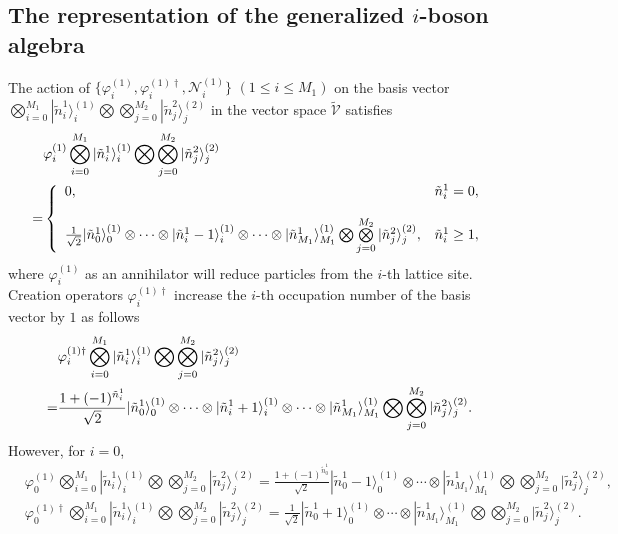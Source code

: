\documentclass[11pt,reqno]{amsart}
\numberwithin{equation}{section}
\begin{document}
\subsection{The representation of the   generalized $i$-boson algebra}
The action of $\{\varphi_i^{(1)},\varphi_i^{(1)\dagger}, \mathcal{N}_i^{(1)} \}$ $( 1\leq i\leq M_1)$ on the basis vector $\bigotimes\limits_{i=0}^{M_{1}}|\tilde{n}_{i}^{1} \rangle_{i}^{(1)}\bigotimes\bigotimes\limits_{j=0}^{M_{2}}|\tilde{n}_{j}^{2}\rangle_{j}^{(2)} $ in the vector space $\tilde{\mathcal{V}}$ satisfies
	\begin{align}\label{right-ym}
		&\varphi_i^{(1)} \bigotimes_{i=0}^{M_{1}}|\tilde{n}_{i}^{1} \rangle_{i}^{(1)}\bigotimes\bigotimes_{j=0}^{M_{2}}|\tilde{n}_{j}^{2}\rangle_{j}^{(2)}   \notag\\
		=&\left\{
		\begin{array}
			{ll}0, & \tilde{n}_{i}^{1}=0, \\
			\\
			\frac{1}{\sqrt{2}}|\tilde{n}_{0}^{1} \rangle_0^{(1)}\otimes\cdots\otimes|\tilde{n}_{i}^{1}-1\rangle_i^{(1)}\otimes\cdots\otimes|\tilde{n}_{M_1}^{1}\rangle_{M_1}^{(1)}\bigotimes\bigotimes\limits_{j=0}^{M_{2}}|\tilde{n}_{j}^{2}\rangle_{j}^{(2)}, & \tilde{n}_{i}^{1}\geq1,
		\end{array}\right.
	\end{align}	
	where $\varphi_i^{(1)}$   as an annihilator will  reduce particles from the $i$-th lattice site.
Creation operators $\varphi_i^{(1)\dagger}$   increase the $i$-th occupation number of the basis vector by $1$ as follows
\begin{align}\label{right-sc}
&\varphi_i^{(1)\dagger}
\bigotimes_{i=0}^{M_{1}}|\tilde{n}_{i}^{1} \rangle_{i}^{(1)}\bigotimes\bigotimes_{j=0}^{M_{2}}|\tilde{n}_{j}^{2}\rangle_{j}^{(2)} 	\notag\\	
=&\frac{1 + (-1)^{\tilde{n}_i^{1}}}{\sqrt{2}} |\tilde{n}_{0}^{1}\rangle_0^{(1)}\otimes\cdots\otimes|\tilde{n}_{i}^{1}+1\rangle_i^{(1)}\otimes\cdots\otimes|\tilde{n}_{M_1}^{1}\rangle_{M_1}^{(1)}\bigotimes\bigotimes\limits_{j=0}^{M_{2}}|\tilde{n}_{j}^{2}\rangle_{j}^{(2)}.
\end{align}	
However, for $i=0$,
\begin{align}
&\varphi_0^{(1)}
\bigotimes_{i=0}^{M_{1}}|\tilde{n}_{i}^{1} \rangle_{i}^{(1)}\bigotimes\bigotimes_{j=0}^{M_{2}}|\tilde{n}_{j}^{2}\rangle_{j}^{(2)} 		=\frac{1 + (-1)^{\tilde{n}_0^{1}}}{\sqrt{2}} |\tilde{n}_{0}^{1}-1\rangle_0^{(1)}\otimes\cdots\otimes|\tilde{n}_{M_1}^{1}\rangle_{M_1}^{(1)}\bigotimes\bigotimes\limits_{j=0}^{M_{2}}|\tilde{n}_{j}^{2}\rangle_{j}^{(2)}, \label{right-ym0}\\
		&\varphi_0^{(1)\dagger}
		\bigotimes_{i=0}^{M_{1}}|\tilde{n}_{i}^{1} \rangle_{i}^{(1)}\bigotimes\bigotimes_{j=0}^{M_{2}}|\tilde{n}_{j}^{2}\rangle_{j}^{(2)} 	=\frac{1}{\sqrt{2}} |\tilde{n}_{0}^{1}+1\rangle_0^{(1)}\otimes\cdots\otimes|\tilde{n}_{M_1}^{1}\rangle_{M_1}^{(1)}\bigotimes\bigotimes\limits_{j=0}^{M_{2}}|\tilde{n}_{j}^{2}\rangle_{j}^{(2)}.\label{right-sc0}	 \end{align}	
\end{document}
